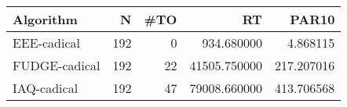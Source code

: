 \begin{tabular}{lrrrr}
\toprule
Algorithm & N & #TO & RT & PAR10 \\
\midrule
EEE-cadical & 192 & 0 & 934.680000 & 4.868115 \\
FUDGE-cadical & 192 & 22 & 41505.750000 & 217.207016 \\
IAQ-cadical & 192 & 47 & 79008.660000 & 413.706568 \\
\bottomrule
\end{tabular}
